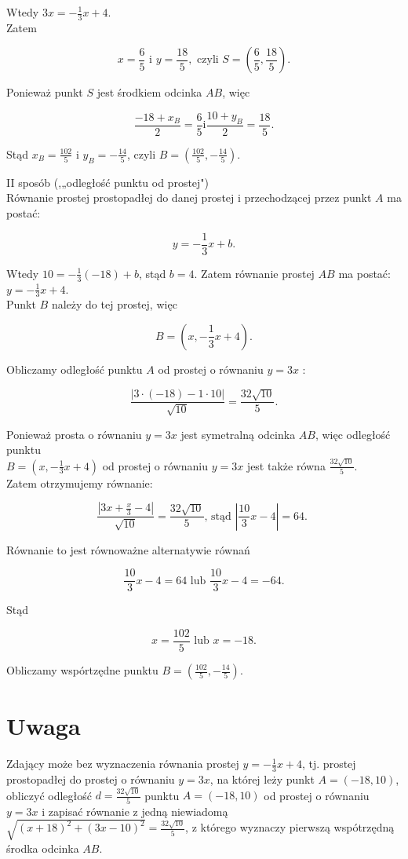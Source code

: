 \documentclass[10pt]{article}
\begin{document}
Wtedy $3 x=-\frac{1}{3} x+4$.\\
Zatem

$$
x=\frac{6}{5} \text { i } y=\frac{18}{5}, \text { czyli } S=\left(\frac{6}{5}, \frac{18}{5}\right) .
$$

Ponieważ punkt $S$ jest środkiem odcinka $A B$, więc

$$
\frac{-18+x_{B}}{2}=\frac{6}{5} \mathrm{i} \frac{10+y_{B}}{2}=\frac{18}{5} .
$$

Stąd $x_{B}=\frac{102}{5}$ i $y_{B}=-\frac{14}{5}$, czyli $B=\left(\frac{102}{5},-\frac{14}{5}\right)$.

II sposób (,„odległość punktu od prostej")\\
Równanie prostej prostopadłej do danej prostej i przechodzącej przez punkt $A$ ma postać:

$$
y=-\frac{1}{3} x+b .
$$

Wtedy $10=-\frac{1}{3}(-18)+b$, stąd $b=4$. Zatem równanie prostej $A B$ ma postać: $y=-\frac{1}{3} x+4$.\\
Punkt $B$ należy do tej prostej, więc

$$
B=\left(x,-\frac{1}{3} x+4\right) .
$$

Obliczamy odległość punktu $A$ od prostej o równaniu $y=3 x$ :

$$
\frac{|3 \cdot(-18)-1 \cdot 10|}{\sqrt{10}}=\frac{32 \sqrt{10}}{5} .
$$

Ponieważ prosta o równaniu $y=3 x$ jest symetralną odcinka $A B$, więc odległość punktu\\
$B=\left(x,-\frac{1}{3} x+4\right)$ od prostej o równaniu $y=3 x$ jest także równa $\frac{32 \sqrt{10}}{5}$.\\
Zatem otrzymujemy równanie:

$$
\frac{\left|3 x+\frac{x}{3}-4\right|}{\sqrt{10}}=\frac{32 \sqrt{10}}{5} \text {, stąd }\left|\frac{10}{3} x-4\right|=64 \text {. }
$$

Równanie to jest równoważne alternatywie równań

$$
\frac{10}{3} x-4=64 \text { lub } \frac{10}{3} x-4=-64 .
$$

Stąd

$$
x=\frac{102}{5} \text { lub } x=-18 .
$$

Obliczamy wspórtzędne punktu $B=\left(\frac{102}{5},-\frac{14}{5}\right)$.

\section*{Uwaga}
Zdający może bez wyznaczenia równania prostej $y=-\frac{1}{3} x+4$, tj. prostej prostopadłej do prostej o równaniu $y=3 x$, na której leży punkt $A=(-18,10)$, obliczyć odległość $d=\frac{32 \sqrt{10}}{5}$ punktu $A=(-18,10)$ od prostej o równaniu $y=3 x$ i zapisać równanie z jedną niewiadomą $\sqrt{(x+18)^{2}+(3 x-10)^{2}}=\frac{32 \sqrt{10}}{5}$, z którego wyznaczy pierwszą wspótrzędną środka odcinka $A B$.
\end{document}
